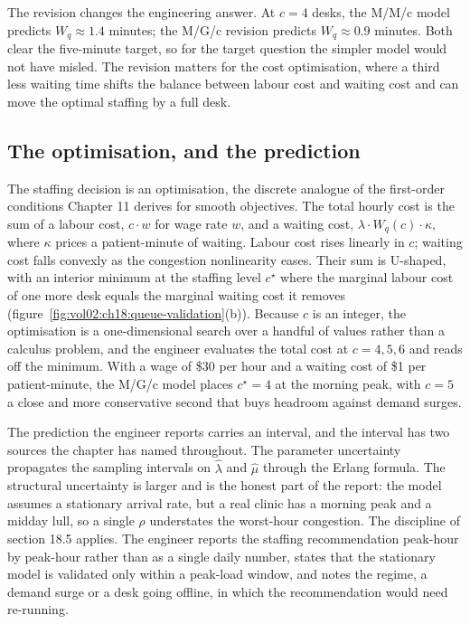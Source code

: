 The revision changes the engineering answer. At $c = 4$ desks, the M/M/c
model predicts $W_q \approx 1.4$ minutes; the M/G/c revision predicts
$W_q \approx 0.9$ minutes. Both clear the five-minute target, so for the
target question the simpler model would not have misled. The revision
matters for the cost optimisation, where a third less waiting time shifts
the balance between labour cost and waiting cost and can move the optimal
staffing by a full desk.

\subsection{The optimisation, and the prediction}

The staffing decision is an optimisation, the discrete analogue of the
first-order conditions Chapter 11 derives for smooth objectives. The total
hourly cost is the sum of a labour cost, $c \cdot w$ for wage rate $w$,
and a waiting cost, $\lambda \cdot W_q(c) \cdot \kappa$, where $\kappa$
prices a patient-minute of waiting. Labour cost rises linearly in $c$;
waiting cost falls convexly as the congestion nonlinearity eases. Their
sum is U-shaped, with an interior minimum at the staffing level $c^\star$
where the marginal labour cost of one more desk equals the marginal
waiting cost it removes
(figure~\ref{fig:vol02:ch18:queue-validation}(b)). Because $c$ is an
integer, the optimisation is a one-dimensional search over a handful of
values rather than a calculus problem, and the engineer evaluates the
total cost at $c = 4, 5, 6$ and reads off the minimum. With a wage of
\$30 per hour and a waiting cost of \$1 per patient-minute, the M/G/c
model places $c^\star = 4$ at the morning peak, with $c = 5$ a close and
more conservative second that buys headroom against demand surges.

The prediction the engineer reports carries an interval, and the interval
has two sources the chapter has named throughout. The parameter
uncertainty propagates the sampling intervals on $\hat\lambda$ and
$\hat\mu$ through the Erlang formula. The structural uncertainty is larger
and is the honest part of the report: the model assumes a stationary
arrival rate, but a real clinic has a morning peak and a midday lull, so a
single $\rho$ understates the worst-hour congestion. The discipline of
section 18.5 applies. The engineer reports the staffing recommendation
peak-hour by peak-hour rather than as a single daily number, states that
the stationary model is validated only within a peak-load window, and
notes the regime, a demand surge or a desk going offline, in which the
recommendation would need re-running.

